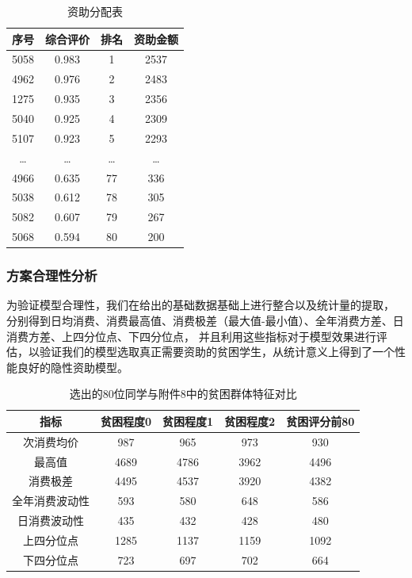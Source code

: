 \documentclass{article}
\begin{document}
\begin{table}[htbp]
  \centering
  \caption{资助分配表}
  \label{allocation}
  \begin{tabular}{cccc}
    \toprule
    序号      & 综合评价 & 排名     & 资助金额 \\
    \midrule
    5058      & 0.983     & 1      & 2537  \\
    4962      & 0.976     & 2      & 2483  \\
    1275      & 0.935     & 3      & 2356  \\
    5040      & 0.925     & 4      & 2309  \\
    5107      & 0.923     & 5      & 2293  \\
    \dots     & \dots     & \dots  & \dots \\
    4966      & 0.635     & 77     & 336   \\
    5038      & 0.612     & 78     & 305   \\
    5082      & 0.607     & 79     & 267   \\
    5068      & 0.594     & 80     & 200   \\
    \bottomrule
  \end{tabular}
\end{table}

\subsubsection{方案合理性分析}

为验证模型合理性，我们在给出的基础数据基础上进行整合以及统计量的提取，
分别得到日均消费、消费最高值、消费极差（最大值-最小值）、全年消费方差、日消费方差、上四分位点、下四分位点，
并且利用这些指标对于模型效果进行评估，以验证我们的模型选取真正需要资助的贫困学生，从统计意义上得到了一个性能良好的隐性资助模型。

\begin{table}[htbp]
  \centering
  \caption{选出的80位同学与附件8中的贫困群体特征对比}
  \label{comparison}
  \begin{tabular}{ccccc}
    \toprule
    指标 & 贫困程度0 & 贫困程度1 & 贫困程度2 & 贫困评分前80 \\
    \midrule
    次消费均价      & 987     & 965      & 973    & 930  \\
    最高值          & 4689    & 4786    & 3962    & 4496 \\
    消费极差        & 4495    & 4537     & 3920   & 4382 \\
    全年消费波动性  & 593     & 580      & 648    & 586  \\
    日消费波动性    & 435     & 432     & 428     & 480  \\
    上四分位点      & 1285    & 1137     & 1159   & 1092 \\
    下四分位点      & 723     & 697      & 702    & 664  \\
    \bottomrule
  \end{tabular}
\end{table}
\end{document}
